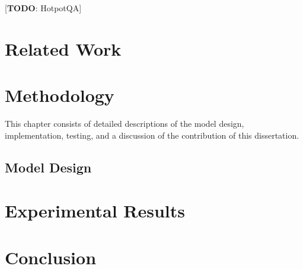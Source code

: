 \documentclass{report}
\begin{document}
[\textbf{TODO}: HotpotQA]




\chapter{Related Work}

\chapter{Methodology}
This chapter consists of detailed descriptions of the model design, implementation, testing, and a discussion of the contribution of this dissertation.

\section{Model Design}

\chapter{Experimental Results}

\chapter{Conclusion}

\appendix



\end{document}
